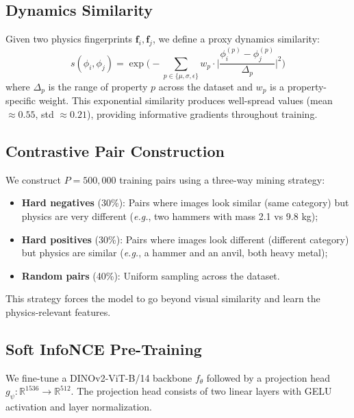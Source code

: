 \documentclass{article}
\newcommand{\eg}{\textit{e.g.}}
\newcommand{\reals}{\mathbb{R}}
\begin{document}
\subsection{Dynamics Similarity}
\label{sec:similarity}

Given two physics fingerprints $\mathbf{f}_i, \mathbf{f}_j$, we define a proxy dynamics similarity:
\begin{equation}
    s(\phi_i, \phi_j) = \exp\!\bigg(-\sum_{p \in \{\mu,\sigma,\epsilon\}} w_p \cdot \bigg|\frac{\phi_i^{(p)} - \phi_j^{(p)}}{\Delta_p}\bigg|^2\bigg)
    \label{eq:proxy_sim}
\end{equation}
where $\Delta_p$ is the range of property $p$ across the dataset and $w_p$ is a property-specific weight. This exponential similarity produces well-spread values (mean $\approx 0.55$, std $\approx 0.21$), providing informative gradients throughout training.


\subsection{Contrastive Pair Construction}
\label{sec:pairs}

We construct $P{=}500{,}000$ training pairs using a three-way mining strategy:
\begin{itemize}
    \item \textbf{Hard negatives} (30\%): Pairs where images look similar (same category) but physics are very different (\eg, two hammers with mass 2.1 vs 9.8 kg);
    \item \textbf{Hard positives} (30\%): Pairs where images look different (different category) but physics are similar (\eg, a hammer and an anvil, both heavy metal);
    \item \textbf{Random pairs} (40\%): Uniform sampling across the dataset.
\end{itemize}

This strategy forces the model to go beyond visual similarity and learn the physics-relevant features.


\subsection{Soft InfoNCE Pre-Training}
\label{sec:loss}

We fine-tune a DINOv2-ViT-B/14 backbone $f_\theta$ followed by a projection head $g_\psi: \reals^{1536} \to \reals^{512}$. The projection head consists of two linear layers with GELU activation and layer normalization.
\end{document}
